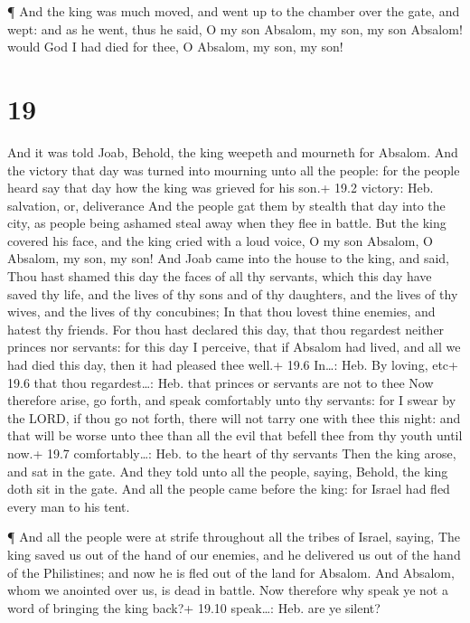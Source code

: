  ¶ And the king was much moved, and went up to the chamber
over the gate, and wept: and as he went, thus he said, O my son Absalom,
my son, my son Absalom! would God I had died for thee, O Absalom, my
son, my son!

\hypertarget{section-18}{%
\section{19}\label{section-18}}

 And it was told Joab, Behold, the king weepeth and mourneth
for Absalom.  And the victory that day was turned into
mourning unto all the people: for the people heard say that day how the
king was grieved for his son.+ 19.2 victory: Heb. salvation, or,
deliverance  And the people gat them by stealth that day
into the city, as people being ashamed steal away when they flee in
battle.  But the king covered his face, and the king cried
with a loud voice, O my son Absalom, O Absalom, my son, my son!
 And Joab came into the house to the king, and said, Thou
hast shamed this day the faces of all thy servants, which this day have
saved thy life, and the lives of thy sons and of thy daughters, and the
lives of thy wives, and the lives of thy concubines;  In
that thou lovest thine enemies, and hatest thy friends. For thou hast
declared this day, that thou regardest neither princes nor servants: for
this day I perceive, that if Absalom had lived, and all we had died this
day, then it had pleased thee well.+ 19.6 In\ldots: Heb. By loving, etc+
19.6 that thou regardest\ldots: Heb. that princes or servants are not to
thee  Now therefore arise, go forth, and speak comfortably
unto thy servants: for I swear by the LORD, if thou go not forth, there
will not tarry one with thee this night: and that will be worse unto
thee than all the evil that befell thee from thy youth until now.+ 19.7
comfortably\ldots: Heb. to the heart of thy servants  Then
the king arose, and sat in the gate. And they told unto all the people,
saying, Behold, the king doth sit in the gate. And all the people came
before the king: for Israel had fled every man to his tent.

 ¶ And all the people were at strife throughout all the
tribes of Israel, saying, The king saved us out of the hand of our
enemies, and he delivered us out of the hand of the Philistines; and now
he is fled out of the land for Absalom.  And Absalom, whom
we anointed over us, is dead in battle. Now therefore why speak ye not a
word of bringing the king back?+ 19.10 speak\ldots: Heb. are ye silent?

